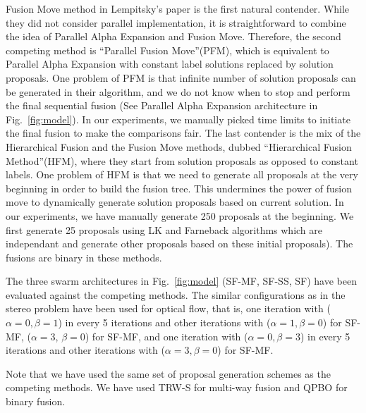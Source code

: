 \noindent Fusion Move method in Lempitsky's paper is the first natural
contender. While they did not consider parallel implementation, it is
straightforward to combine the idea of Parallel Alpha Expansion and
Fusion Move. Therefore, the second competing method is ``Parallel Fusion
Move''(PFM), which is equivalent to Parallel Alpha Expansion with constant
label solutions replaced by solution proposals.
%
One problem of PFM is that infinite number of solution proposals can be
generated in their algorithm, and we do not know when to stop and
perform the final sequential fusion (See Parallel Alpha Expansion
architecture in Fig.~\ref{fig:model}). In our experiments, we manually
picked time limits to initiate the final fusion to make the comparisons
fair.
%
The last contender is the mix of the Hierarchical Fusion and the Fusion
Move methods, dubbed ``Hierarchical Fusion Method''(HFM), where they
start from solution proposals as opposed to constant labels. One problem
of HFM is that we need to generate all proposals at the very beginning in order to build the fusion tree. This undermines the power of fusion move to dynamically generate solution proposals based on current solution. In our experiments, we have manually generate 250 proposals at the beginning. We first generate 25 proposals using LK and Farneback algorithms which are independant and generate other proposals based on these initial proposals). The fusions are binary in these methods. %


\noindent
The three swarm architectures in Fig.~\ref{fig:model} (SF-MF, SF-SS, SF)
have been evaluated against the competing methods. The similar
configurations as in the stereo problem have been used for optical flow,
that is, one iteration with ($\alpha=0, \beta=1$) in every 5 iterations and other iterations with ($\alpha=1, \beta=0$) for SF-MF, ($\alpha=3$, $\beta=0$) for SF-MF, and one iteration with ($\alpha=0, \beta=3$) in every 5 iterations and other iterations with ($\alpha=3, \beta=0$) for SF-MF.

%
Note that we have used the same set of proposal generation schemes as
the competing methods. We have used TRW-S for multi-way fusion and QPBO
for binary fusion.
%
%
